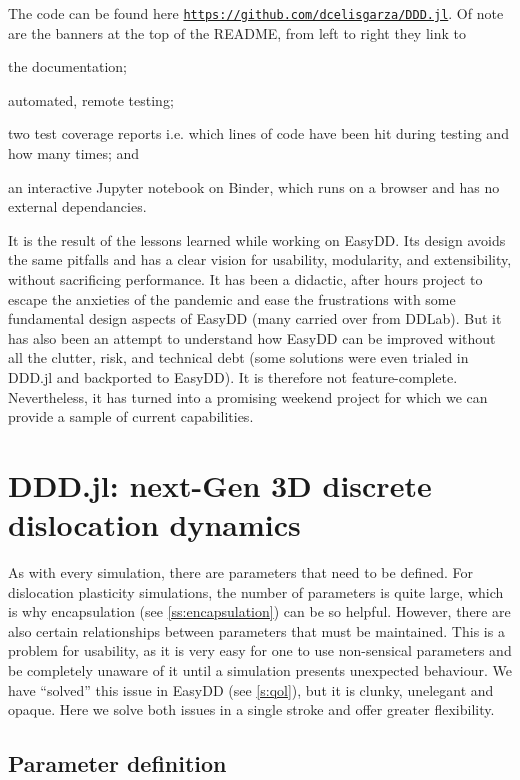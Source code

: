 The code can be found here \href{https://github.com/dcelisgarza/DDD.jl}{\texttt{https://github.com/dcelisgarza/DDD.jl}}. Of note are the banners at the top of the README, from left to right they link to
\begin{inparaenum}
    \item the documentation;
    \item automated, remote testing;
    \item two test coverage reports i.e. which lines of code have been hit during testing and how many times; and
    \item an interactive Jupyter notebook on Binder, which runs on a browser and has no external dependancies.
\end{inparaenum}

It is the result of the lessons learned while working on EasyDD. Its design avoids the same pitfalls and has a clear vision for usability, modularity, and extensibility, without sacrificing performance. It has been a didactic, after hours project to escape the anxieties of the pandemic and ease the frustrations with some fundamental design aspects of EasyDD (many carried over from DDLab). But it has also been an attempt to understand how EasyDD can be improved without all the clutter, risk, and technical debt (some solutions were even trialed in DDD.jl and backported to EasyDD). It is therefore not feature-complete. Nevertheless, it has turned into a promising weekend project for which we can provide a sample of current capabilities.

\section{DDD.jl: next-Gen 3D discrete dislocation dynamics}

As with every simulation, there are parameters that need to be defined. For dislocation plasticity simulations, the number of parameters is quite large, which is why encapsulation (see \cref{ss:encapsulation}) can be so helpful. However, there are also certain relationships between parameters that must be maintained. This is a problem for usability, as it is very easy for one to use non-sensical parameters and be completely unaware of it until a simulation presents unexpected behaviour. We have ``solved'' this issue in EasyDD (see \cref{s:qol}), but it is clunky, unelegant and opaque. Here we solve both issues in a single stroke and offer greater flexibility.

\subsection{Parameter definition}

